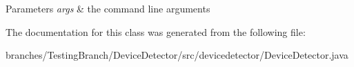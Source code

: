 \begin{DoxyParams}{Parameters}
{\em args} & the command line arguments \\
\hline
\end{DoxyParams}


The documentation for this class was generated from the following file\-:\begin{DoxyCompactItemize}
\item 
branches/\-Testing\-Branch/\-Device\-Detector/src/devicedetector/Device\-Detector.\-java\end{DoxyCompactItemize}
